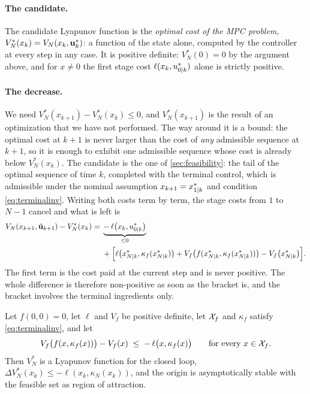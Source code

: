 \paragraph{The candidate.} The candidate Lyapunov function is the \emph{optimal cost of the MPC
problem}, $V^*_N(x_k) = V_N(x_k, \mathbf{u}^*_k)$: a function of the state alone, computed by the
controller at every step in any case. It is positive definite: $V^*_N(0) = 0$ by the argument
above, and for $x \ne 0$ the first stage cost $\ell(x_k, u^*_{{0|k}})$ alone is strictly
positive.

\paragraph{The decrease.} We need $V^*_N(x_{k+1}) - V^*_N(x_k) \le 0$, and $V^*_N(x_{k+1})$ is
the result of an optimization that we have not performed. The way around it is a bound: the
optimal cost at $k+1$ is never larger than the cost of \emph{any} admissible sequence at $k+1$,
so it is enough to exhibit one admissible sequence whose cost is already below $V^*_N(x_k)$. The
candidate is the one of \cref{sec:feasibility}: the tail of the optimal sequence of time $k$,
completed with the terminal control, which is admissible under the nominal assumption
$x_{k+1} = x^*_{{1|k}}$ and condition \eqref{eq:terminalinv}. Writing both costs term by term,
the stage costs from $1$ to $N-1$ cancel and what is left is
\begin{equation}
\begin{split}
  V_N(x_{k+1}, \tilde{\mathbf{u}}_{k+1}) - V^*_N(x_k)
  = {}& \underbrace{-\,\ell\big(x_k, u^*_{{0|k}}\big)}_{\le 0} \\
  &+ \Big[\ell\big(x^*_{{N|k}}, \kappa_f(x^*_{{N|k}})\big)
       + V_f\big(f(x^*_{{N|k}}, \kappa_f(x^*_{{N|k}}))\big) - V_f\big(x^*_{{N|k}}\big)\Big].
\end{split}
  \label{eq:decrease}
\end{equation}
The first term is the cost paid at the current step and is never positive. The whole difference
is therefore non-positive as soon as the bracket is, and the bracket involves the terminal
ingredients only.

\begin{theorem}
Let $f(0,0) = 0$, let $\ell$ and $V_f$ be positive definite, let $\mathcal{X}_f$ and $\kappa_f$ satisfy
\eqref{eq:terminalinv}, and let
\begin{equation}
  V_f\big(f(x, \kappa_f(x))\big) - V_f(x) \;\le\; -\,\ell\big(x, \kappa_f(x)\big)
  \qquad \text{for every } x \in \mathcal{X}_f .
  \label{eq:terminalcond}
\end{equation}
Then $V^*_N$ is a Lyapunov function for the closed loop, $\Delta V^*_N(x_k) \le -\ell(x_k,
\kappa_N(x_k))$, and the origin is asymptotically stable with the feasible set as region of
attraction.
\end{theorem}

